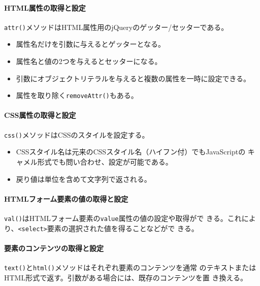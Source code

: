 \paragraph{HTML属性の取得と設定}
\texttt{attr()}メソッドはHTML属性用のjQueryのゲッター/セッターである。
\begin{itemize}
 \item 属性名だけを引数に与えるとゲッターとなる。
 \item 属性名と値の2つを与えるとセッターになる。
 \item 引数にオブジェクトリテラルを与えると複数の属性を一時に設定できる。
 \item 属性を取り除く\texttt{removeAttr()}もある。
\end{itemize}
\paragraph{CSS属性の取得と設定}
\texttt{css()}メソッドはCSSのスタイルを設定する。
\begin{itemize}
 \item CSSスタイル名は元来のCSSスタイル名（ハイフン付）でもJavaScriptの
       キャメル形式でも問い合わせ、設定が可能である。
 \item 戻り値は単位を含めて文字列で返される。
\end{itemize}
\paragraph{HTMLフォーム要素の値の取得と設定}
\texttt{val()}はHTMLフォーム要素の\texttt{value}属性の値の設定や取得がで
きる。これにより、\texttt{<select>}要素の選択された値を得ることなどがで
きる。
\paragraph{要素のコンテンツの取得と設定}
\texttt{text()}と\texttt{html()}メソッドはそれぞれ要素のコンテンツを通常
のテキストまたはHTML形式で返す。引数がある場合には、既存のコンテンツを置
き換える。
